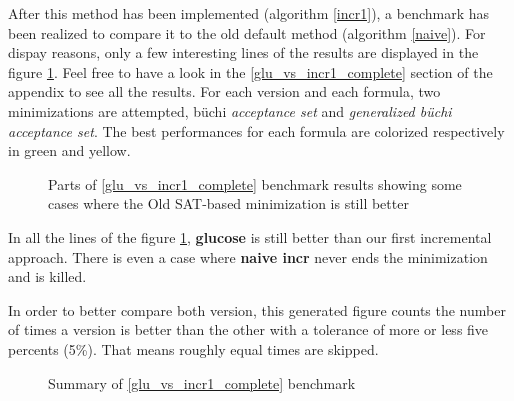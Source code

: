 \noindent After this method has been implemented (algorithm \ref{incr1}), a benchmark has been realized to
compare it to the old default method (algorithm \ref{naive}). For dispay reasons, only a few interesting
lines of the results are displayed in the figure \ref{fig:glu_vs_incr1_short}. Feel free to have a look
in the \ref{glu_vs_incr1_complete} section of the appendix to see all the results. For each version and
each formula, two minimizations are attempted, büchi \textit{acceptance set} and
\textit{generalized büchi acceptance set}. The best performances for each formula are colorized
respectively in green and yellow.

\begin{figure}[H]
 \centering
 \fontsize{9}{11}
 \caption{Parts of \ref{glu_vs_incr1_complete} benchmark results showing some cases where the Old SAT-based
          minimization is still better}
 \label{fig:glu_vs_incr1_short}
\end{figure}

In all the lines of the figure \ref{fig:glu_vs_incr1_short}, \textbf{glucose} is still better than our first
incremental approach. There is even a case where \textbf{naive incr} never ends the minimization and
is killed.

In order to better compare both version, this generated figure counts the number of times a version is better
than the other with a tolerance of more or less five percents (5\%). That means roughly equal times are skipped.
\begin{figure}[H]
 \centering
 
 \caption{Summary of \ref{glu_vs_incr1_complete} benchmark}
 \label{fig:glu_vs_incr1_resume}
\end{figure}

